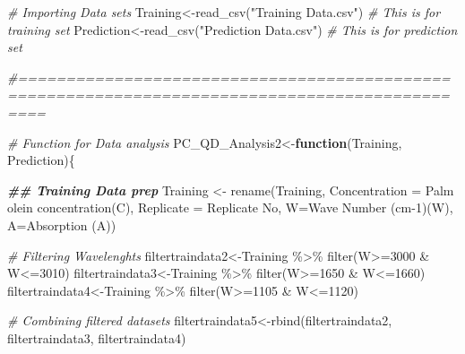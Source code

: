 \documentclass[
]{article}
\newenvironment{Shaded}{\begin{snugshade}}{\end{snugshade}}
\newcommand{\AttributeTok}[1]{\textcolor[rgb]{0.77,0.63,0.00}{#1}}
\newcommand{\CommentTok}[1]{\textcolor[rgb]{0.56,0.35,0.01}{\textit{#1}}}
\newcommand{\ControlFlowTok}[1]{\textcolor[rgb]{0.13,0.29,0.53}{\textbf{#1}}}
\newcommand{\DecValTok}[1]{\textcolor[rgb]{0.00,0.00,0.81}{#1}}
\newcommand{\DocumentationTok}[1]{\textcolor[rgb]{0.56,0.35,0.01}{\textbf{\textit{#1}}}}
\newcommand{\FunctionTok}[1]{\textcolor[rgb]{0.00,0.00,0.00}{#1}}
\newcommand{\NormalTok}[1]{#1}
\newcommand{\OtherTok}[1]{\textcolor[rgb]{0.56,0.35,0.01}{#1}}
\newcommand{\SpecialCharTok}[1]{\textcolor[rgb]{0.00,0.00,0.00}{#1}}
\newcommand{\StringTok}[1]{\textcolor[rgb]{0.31,0.60,0.02}{#1}}
\begin{document}
\begin{Shaded}
\begin{Highlighting}[]
\CommentTok{\# Importing Data sets}
\NormalTok{Training}\OtherTok{\textless{}{-}}\FunctionTok{read\_csv}\NormalTok{(}\StringTok{"Training Data.csv"}\NormalTok{) }\CommentTok{\# This is for training set}
\NormalTok{Prediction}\OtherTok{\textless{}{-}}\FunctionTok{read\_csv}\NormalTok{(}\StringTok{"Prediction Data.csv"}\NormalTok{) }\CommentTok{\# This is for prediction set}

\CommentTok{\#===============================================================================================}

\CommentTok{\# Function for Data analysis}
\NormalTok{PC\_QD\_Analysis2}\OtherTok{\textless{}{-}}\ControlFlowTok{function}\NormalTok{(Training, Prediction)\{}
  
  \DocumentationTok{\#\# Training Data prep}
\NormalTok{  Training }\OtherTok{\textless{}{-}} \FunctionTok{rename}\NormalTok{(Training, }\AttributeTok{Concentration =} \StringTok{\textasciigrave{}}\AttributeTok{Palm olein concentration(C)}\StringTok{\textasciigrave{}}\NormalTok{, }
                     \AttributeTok{Replicate =} \StringTok{\textasciigrave{}}\AttributeTok{Replicate No}\StringTok{\textasciigrave{}}\NormalTok{, }\AttributeTok{W=}\StringTok{\textasciigrave{}}\AttributeTok{Wave Number (cm{-}1)(W)}\StringTok{\textasciigrave{}}\NormalTok{, }\AttributeTok{A=}\StringTok{\textasciigrave{}}\AttributeTok{Absorption (A)}\StringTok{\textasciigrave{}}\NormalTok{)}
  
  \CommentTok{\# Filtering Wavelenghts}
\NormalTok{  filtertraindata2}\OtherTok{\textless{}{-}}\NormalTok{Training }\SpecialCharTok{\%\textgreater{}\%} \FunctionTok{filter}\NormalTok{(W}\SpecialCharTok{\textgreater{}=}\DecValTok{3000} \SpecialCharTok{\&}\NormalTok{ W}\SpecialCharTok{\textless{}=}\DecValTok{3010}\NormalTok{)}
\NormalTok{  filtertraindata3}\OtherTok{\textless{}{-}}\NormalTok{Training }\SpecialCharTok{\%\textgreater{}\%} \FunctionTok{filter}\NormalTok{(W}\SpecialCharTok{\textgreater{}=}\DecValTok{1650} \SpecialCharTok{\&}\NormalTok{ W}\SpecialCharTok{\textless{}=}\DecValTok{1660}\NormalTok{)}
\NormalTok{  filtertraindata4}\OtherTok{\textless{}{-}}\NormalTok{Training }\SpecialCharTok{\%\textgreater{}\%} \FunctionTok{filter}\NormalTok{(W}\SpecialCharTok{\textgreater{}=}\DecValTok{1105} \SpecialCharTok{\&}\NormalTok{ W}\SpecialCharTok{\textless{}=}\DecValTok{1120}\NormalTok{)}
  
  \CommentTok{\# Combining filtered datasets}
\NormalTok{  filtertraindata5}\OtherTok{\textless{}{-}}\FunctionTok{rbind}\NormalTok{(filtertraindata2, filtertraindata3, filtertraindata4) }
  

\end{Highlighting}
\end{Shaded}
\end{document}

